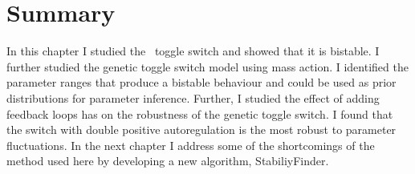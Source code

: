 \section{Summary}

In this chapter I studied the~\textcite{Gardner:2000vha} toggle switch and showed that it is bistable. I further studied the genetic toggle switch model using mass action. I identified the parameter ranges that produce a bistable behaviour and could be used as prior distributions for parameter inference. Further, I studied the effect of adding feedback loops has on the robustness of the genetic toggle switch. I found that the switch with double positive autoregulation is the most robust to parameter fluctuations. In the next chapter I address some of the shortcomings of the method used here by developing a new algorithm, StabiliyFinder. 


